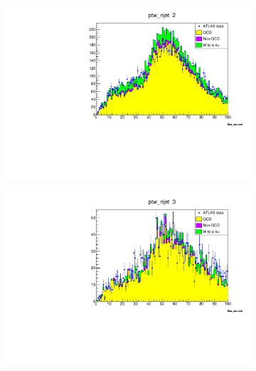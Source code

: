 \begin{figure}[H]
\begin{subfigure}{0.5\textwidth}
        \end{subfigure}
        \begin{subfigure}{0.5\textwidth}
            \includegraphics[width=\textwidth]{../W_mass/ptw_njet2.pdf}
        \end{subfigure}
        \begin{subfigure}{0.5\textwidth}
            \includegraphics[width=\textwidth]{../W_mass/ptw_njet3.pdf}
        \end{subfigure}
        \begin{subfigure}{0.5\textwidth}

\end{subfigure}
\end{figure}
